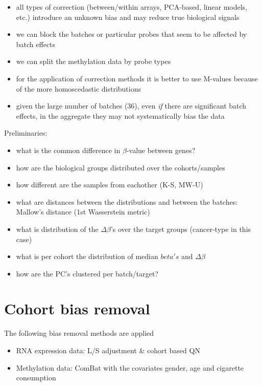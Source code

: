 \documentclass[a4paper,10pt]{article}
\begin{document}
\begin{itemize}
 \item all types of correction (between/within arrays, PCA-based, linear models, etc.) introduce an unknown bias and may reduce true biological signals 
 \item we can block the batches or particular probes that seem to be affected by batch effects
 \item we can split the methylation data by probe types
 \item for the application of correction methods it is better to use M-values because of the more homoscedastic distributions
 \item given the large number of batches ($36$), even \textit{if} there are significant batch effects, in the aggregate they may not systematically bias the data
\end{itemize}

%
Preliminaries:
\begin{itemize}
 \item what is the common difference in $\beta$-value between genes?
 \item how are the biological groups distributed over the cohorts/samples
 \item how different are the samples from eachother (K-S, MW-U)
 \item what are distances between the distributions and between the batches: Mallow’s distance (1st Wasserstein metric)
 \item what is distribution of the $\Delta \beta$'s over the target groups (cancer-type in this case)
 \item what is per cohort the distribution of median $beta's$ and $\Delta \beta$
 \item how are the PC's clustered per batch/target?
\end{itemize}
%
\section{Cohort bias removal}
%
The following bias removal methods are applied
%
\begin{itemize}
\item RNA expression data: L/S adjustment \& cohort based QN
\item Methylation data: ComBat with the covariates gender, age and cigarette consumption
\end{itemize}
\end{document}
